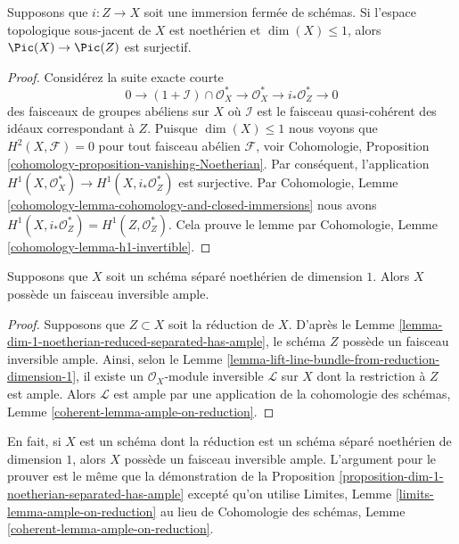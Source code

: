 \begin{lemma}
\label{lemma-lift-line-bundle-from-reduction-dimension-1}
Supposons que $i : Z \to X$ soit une immersion fermée de
schémas. Si l'espace topologique sous-jacent de $X$ est
noethérien et $\dim(X) \leq 1$, alors $\Pic(X) \to \Pic(Z)$ est surjectif.
\end{lemma}

\begin{proof}
Considérez la suite exacte courte
$$
0 \to (1 + \mathcal{I}) \cap \mathcal{O}_X^* \to
\mathcal{O}^*_X \to i_*\mathcal{O}^*_Z \to 0
$$
des faisceaux de groupes abéliens sur $X$ où $\mathcal{I}$
est le faisceau quasi-cohérent des idéaux correspondant à
$Z$. Puisque $\dim(X) \leq 1$ nous voyons que $H^2(X,
\mathcal{F}) = 0$ pour tout faisceau abélien $\mathcal{F}$,
voir Cohomologie, Proposition
\ref{cohomology-proposition-vanishing-Noetherian}. Par
conséquent, l'application $H^1(X, \mathcal{O}^*_X) \to H^1(X,
i_*\mathcal{O}_Z^*)$ est surjective. Par Cohomologie, Lemme
\ref{cohomology-lemma-cohomology-and-closed-immersions} nous avons
$H^1(X, i_*\mathcal{O}_Z^*) = H^1(Z, \mathcal{O}_Z^*)$. Cela prouve
le lemme par Cohomologie, Lemme \ref{cohomology-lemma-h1-invertible}.
\end{proof}

\begin{proposition}
\label{proposition-dim-1-noetherian-separated-has-ample}
Supposons que $X$ soit un schéma séparé noethérien de
dimension $1$. Alors $X$ possède un faisceau inversible ample.
\end{proposition}

\begin{proof}
Supposons que $Z \subset X$ soit la réduction de $X$. D'après
le Lemme
\ref{lemma-dim-1-noetherian-reduced-separated-has-ample}, le schéma
$Z$ possède un faisceau inversible ample. Ainsi, selon le Lemme
\ref{lemma-lift-line-bundle-from-reduction-dimension-1}, il existe un
$\mathcal{O}_X$-module inversible $\mathcal{L}$ sur $X$ dont la
restriction à $Z$ est ample. Alors $\mathcal{L}$ est ample par une application
de la cohomologie des schémas, Lemme \ref{coherent-lemma-ample-on-reduction}.
\end{proof}

\begin{remark}
\label{remark-useless-generalization}
En fait, si $X$ est un schéma dont la réduction est un
schéma séparé noethérien de dimension $1$, alors $X$
possède un faisceau inversible ample. L'argument pour
le prouver est le même que la démonstration de la
Proposition
\ref{proposition-dim-1-noetherian-separated-has-ample} excepté qu'on
utilise Limites, Lemme \ref{limits-lemma-ample-on-reduction} au lieu de
Cohomologie des schémas, Lemme \ref{coherent-lemma-ample-on-reduction}.
\end{remark}

